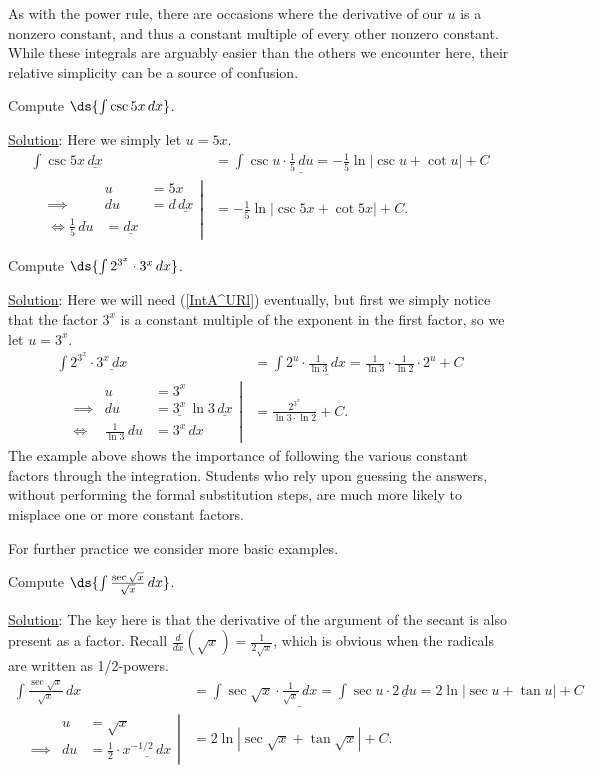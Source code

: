 As with the power rule, there are occasions where the derivative
of our $u$ is a nonzero constant, and thus a constant multiple of every
other nonzero constant.  While these integrals are arguably easier than
the others we encounter here, their relative simplicity can be
a source of confusion.

\bex Compute $\ds{\int\csc5x\,dx}$.

\underline{Solution}: Here we simply let $u=5x$.
\begin{align*}
\int\csc5x\,\underline{dx}&=\int\csc u\cdot\underline{\frac15\,du}
      =-\frac15\ln|\csc u+\cot u|+C\\
\left.\begin{alignedat}{2}
&&u&=5x\\
&\implies&du&=d\,\underline{dx}\\
&\iff\frac15\,du&=\underline{dx}
\end{alignedat}\right|&=-\frac15\ln|\csc5x+\cot 5x|+C.
\end{align*}
\eex

\bex Compute $\ds{\int 2^{3^x}\cdot 3^x\,dx}$.

\underline{Solution}:  Here we will need (\ref{IntA^URl}) eventually,
but first we simply notice that the factor $3^x$ is 
a constant multiple of the exponent in the first factor,
so we let $u=3^x$.
\begin{align*}
\int 2^{3^x}\cdot\underline{3^x\,dx}
&=\int 2^u\cdot\underline{\frac{1}{\ln 3}\,dx}
=\frac{1}{\ln 3}\cdot\frac1{\ln 2}\cdot 2^u+C\\
\left.\begin{alignedat}{2}
&&u&=3^x\\
&\implies&du&=\underline{3^x}\,\ln 3\,\underline{dx}\\
&\iff&\frac1{\ln 3}\,du&=3^x\,dx\end{alignedat}\right|
&=\frac{2^{3^x}}{\ln3\cdot\ln2}+C.
\end{align*}
\eex
The example above shows the importance of following the various
constant factors through the integration.  Students who rely
upon guessing the answers, without performing the
formal substitution steps, are much more likely to misplace
one or more constant factors.

For further practice we consider more basic examples.

\bex Compute $\ds{\int\frac{\sec\sqrt x}{\sqrt{x}}\,dx}$.

\underline{Solution}: The key here is that the derivative
of the argument of the secant is also present as a factor.
Recall $\frac{d}{dx}\left(\sqrt{x}\right)=\frac1{2\sqrt{x}}$,
which is obvious when the radicals are written as 1/2-powers.
\begin{align*}
\int\frac{\sec\sqrt x}{\sqrt{x}}\,dx
&=\int\sec{\sqrt{x}}\cdot\underline{\frac1{\sqrt{x}}\,dx}
=\int\sec u\cdot\underline{2\,du}
=2\ln|\sec u+\tan u|+C\\
\left.\begin{alignedat}{2}
&&u&=\sqrt{x}\\
&\implies&du&=\frac12\cdot\underline{x^{-1/2}\,dx}
\end{alignedat}\right|&=2\ln\left|\sec\sqrt{x}+\tan\sqrt{x}\right|+C.
\end{align*}


